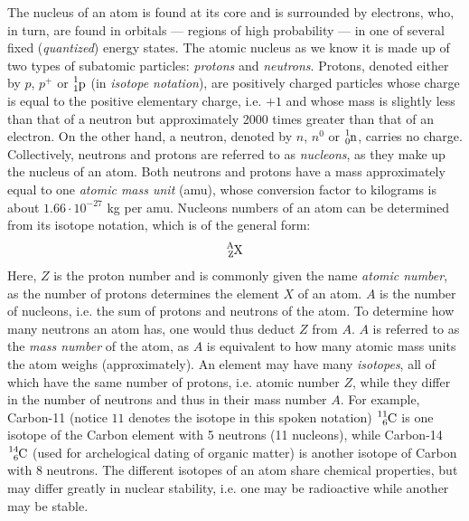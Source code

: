 



\thispagestyle{plain}



The nucleus of an atom is found at its core and is surrounded by electrons, who, in turn, are found in orbitals --- regions of high probability --- in one of several fixed (\emph{quantized}) energy states. The atomic nucleus as we know it is made up of two types of subatomic particles: \emph{protons} and \emph{neutrons}. Protons, denoted either by $p$, $p^+$ or $\ce{^1_1p}$ (in \emph{isotope notation}), are positively charged particles whose charge is equal to the positive elementary charge, i.e. $+1$ and whose mass is slightly less than that of a neutron but approximately 2000 times greater than that of an electron. On the other hand, a neutron, denoted by $n$, $n^0$ or $\ce{^1_0n}$, carries no charge. Collectively, neutrons and protons are referred to as \emph{nucleons}, as they make up the nucleus of an atom. Both neutrons and protons have a mass approximately equal to one \emph{atomic mass unit} (amu), whose conversion factor to kilograms is about $1.66 \cdot 10^{-27}$ kg per amu. Nucleons numbers of an atom can be determined from its isotope notation, which is of the general form: $$\ce{^A_ZX}$$ Here, $Z$ is the proton number and is commonly given the name \emph{atomic number}, as the number of protons determines the element $X$ of an atom. $A$ is the number of nucleons, i.e. the sum of protons and neutrons of the atom. To determine how many neutrons an atom has, one would thus deduct $Z$ from $A$. $A$ is referred to as the \emph{mass number} of the atom, as $A$ is equivalent to how many atomic mass units the atom weighs (approximately). An element may have many \emph{isotopes}, all of which have the same number of protons, i.e. atomic number $Z$, while they differ in the number of neutrons and thus in their mass number $A$. For example, Carbon-11 (notice $11$ denotes the isotope in this spoken notation) $\ce{^{11}_6C}$ is one isotope of the Carbon element with 5 neutrons (11 nucleons), while Carbon-14 $\ce{^{14}_6C}$ (used for archelogical dating of organic matter) is another isotope of Carbon with 8 neutrons. The different isotopes of an atom share chemical properties, but may differ greatly in nuclear stability, i.e. one may be radioactive while another may be stable.


